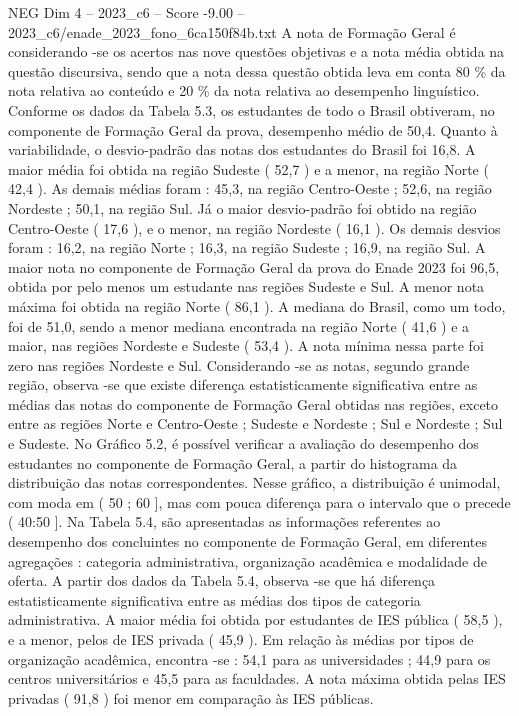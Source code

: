 \begin{textsample}{NEG Dim 4 – 2023\_c6 – Score -9.00 – 2023\_c6/enade\_2023\_fono\_6ca150f84b.txt}
A nota de Formação Geral é considerando -se os acertos nas nove questões objetivas e a nota média obtida na questão discursiva, sendo que a nota dessa questão obtida leva em conta 80 \% da nota relativa ao conteúdo e 20 \% da nota relativa ao desempenho linguístico.
Conforme os dados da Tabela 5.3, os estudantes de todo o Brasil obtiveram, no componente de Formação Geral da prova, desempenho médio de 50,4.
Quanto à variabilidade, o desvio-padrão das notas dos estudantes do Brasil foi 16,8.
A maior média foi obtida na região Sudeste ( 52,7 ) e a menor, na região Norte ( 42,4 ).
As demais médias foram : 45,3, na região Centro-Oeste ; 52,6, na região Nordeste ; 50,1, na região Sul.
Já o maior desvio-padrão foi obtido na região Centro-Oeste ( 17,6 ), e o menor, na região Nordeste ( 16,1 ).
Os demais desvios foram : 16,2, na região Norte ; 16,3, na região Sudeste ; 16,9, na região Sul.
A maior nota no componente de Formação Geral da prova do Enade 2023 foi 96,5, obtida por pelo menos um estudante nas regiões Sudeste e Sul.
A menor nota máxima foi obtida na região Norte ( 86,1 ).
A mediana do Brasil, como um todo, foi de 51,0, sendo a menor mediana encontrada na região Norte ( 41,6 ) e a maior, nas regiões Nordeste e Sudeste ( 53,4 ).
A nota mínima nessa parte foi zero nas regiões Nordeste e Sul.
Considerando -se as notas, segundo grande região, observa -se que existe diferença estatisticamente significativa entre as médias das notas do componente de Formação Geral obtidas nas regiões, exceto entre as regiões Norte e Centro-Oeste ; Sudeste e Nordeste ; Sul e Nordeste ; Sul e Sudeste.
No Gráfico 5.2, é possível verificar a avaliação do desempenho dos estudantes no componente de Formação Geral, a partir do histograma da distribuição das notas correspondentes.
Nesse gráfico, a distribuição é unimodal, com moda em ( 50 ; 60 ], mas com pouca diferença para o intervalo que o precede ( 40:50 ].
Na Tabela 5.4, são apresentadas as informações referentes ao desempenho dos concluintes no componente de Formação Geral, em diferentes agregações : categoria administrativa, organização acadêmica e modalidade de oferta.
A partir dos dados da Tabela 5.4, observa -se que há diferença estatisticamente significativa entre as médias dos tipos de categoria administrativa.
A maior média foi obtida por estudantes de IES pública ( 58,5 ), e a menor, pelos de IES privada ( 45,9 ).
Em relação às médias por tipos de organização acadêmica, encontra -se : 54,1 para as universidades ; 44,9 para os centros universitários e 45,5 para as faculdades.
A nota máxima obtida pelas IES privadas ( 91,8 ) foi menor em comparação às IES públicas.

\end{textsample}
